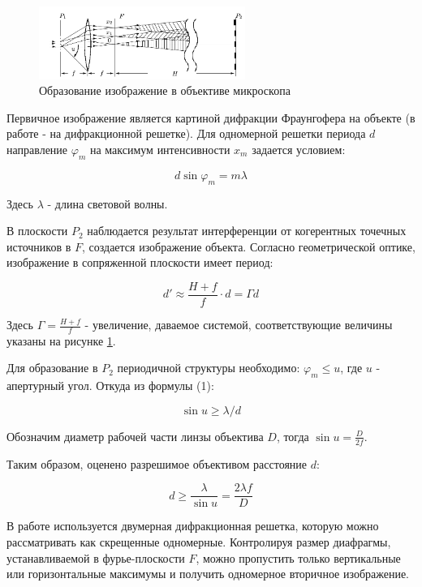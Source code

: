 \documentclass[12pt]{kiarticle}
\begin{document}
	\begin{figure}[h]
		\centering	
		\includegraphics[width=0.6\textwidth]{abbe.png}
		\caption{Образование изображение в объективе микроскопа}
		\label{abbe}
	\end{figure}
	
	Первичное изображение является картиной дифракции Фраунгофера на объекте (в работе - на дифракционной решетке). Для одномерной решетки периода $d$ направление $\varphi_m$ на максимум интенсивности $x_m$ задается условием: 
	
	\begin{equation}
		d\sin\varphi_m = m\lambda
	\end{equation} 
	
	Здесь $\lambda$ - длина световой волны. 
	
	В плоскости $P_2$ наблюдается результат интерференции от когерентных точечных источников в $F$, создается изображение объекта. Согласно геометрической оптике, изображение в сопряженной плоскости имеет период: 
	
	\begin{equation}
		d' \approx \frac{H + f}{f} \cdot d = \Gamma d
	\end{equation}
	
	Здесь $\Gamma = \frac{H+f}{f}$ - увеличение, даваемое системой, соответствующие величины указаны на рисунке \ref{abbe}. 
	
	Для образование в $P_2$ периодичной структуры необходимо: $\varphi_m \le u$, где $u$ - апертурный угол. Откуда из формулы (1): 
	
	\[ \sin u \ge \lambda/d \]
	
	Обозначим диаметр рабочей части линзы объектива $D$, тогда $\sin u = \frac{D}{2f}$.
	
	Таким образом, оценено разрешимое объективом расстояние $d$:
	
	\begin{equation}
		d \ge \frac{\lambda}{\sin u} = \frac{2\lambda f}{D}
	\end{equation} 
	
	В работе используется двумерная дифракционная решетка, которую можно рассматривать как скрещенные одномерные. Контролируя размер диафрагмы, устанавливаемой в фурье-плоскости $F$, можно пропустить только вертикальные или горизонтальные максимумы и получить одномерное вторичное изображение. 
	
\end{document}
